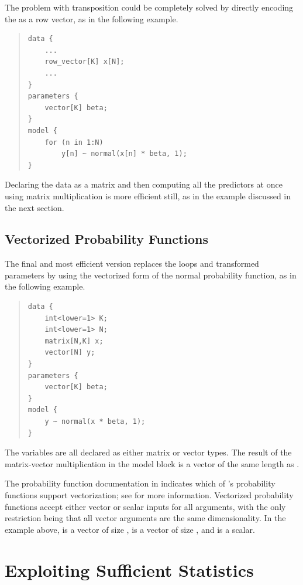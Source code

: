 %
The problem with transposition could be completely solved by directly
encoding the  as a row vector, as in the
following example.
%
\begin{quote}
\begin{Verbatim} 
data {
    ...
    row_vector[K] x[N];
    ...
}
parameters {
    vector[K] beta;
}
model {
    for (n in 1:N)
        y[n] ~ normal(x[n] * beta, 1);
}
\end{Verbatim}
\end{quote}
%
Declaring the data as a matrix and then computing all the predictors
at once using matrix multiplication is more efficient still, as in the
example discussed in the next section.

\subsection{Vectorized Probability Functions}

The final and most efficient version replaces the loops and
transformed parameters by using the vectorized form of the normal
probability function, as in the following example.
%
\begin{quote}
\begin{Verbatim} 
data {
    int<lower=1> K;
    int<lower=1> N;
    matrix[N,K] x;
    vector[N] y;
}
parameters {
    vector[K] beta;
} 
model {
    y ~ normal(x * beta, 1);
}
\end{Verbatim}
\end{quote}
%
The variables are all declared as either matrix or vector types.
The result of the matrix-vector multiplication  in the
model block is a vector of the same length as .  

The probability function documentation in 
indicates which of \Stan's probability functions support
vectorization; see  for more
information.  Vectorized probability functions accept either vector or
scalar inputs for all arguments, with the only restriction being that
all vector arguments are the same dimensionality.  In the example
above,  is a vector of size ,  is a
vector of size , and  is a scalar.

\section{Exploiting Sufficient Statistics}

